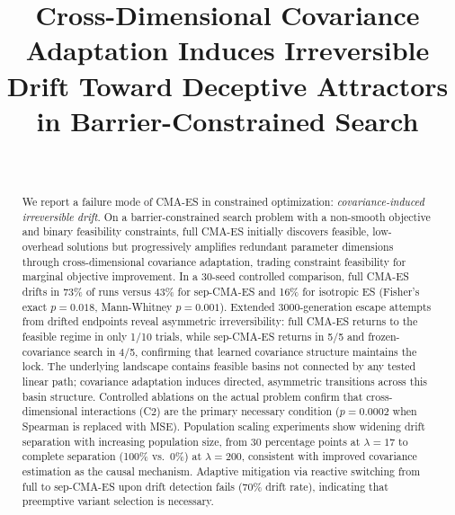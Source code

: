 \documentclass[twoside]{article}
\begin{document}

\title{\bf Cross-Dimensional Covariance Adaptation Induces Irreversible Drift
Toward Deceptive Attractors in Barrier-Constrained Search}

\author{%
 \hfill {}\\
}

\maketitle

\begin{abstract}
We report a failure mode of CMA-ES in constrained optimization:
\emph{covariance-induced irreversible drift}. On a barrier-constrained
search problem with a non-smooth objective and binary feasibility
constraints, full CMA-ES initially discovers feasible, low-overhead
solutions but progressively amplifies redundant parameter dimensions
through cross-dimensional covariance adaptation, trading constraint
feasibility for marginal objective improvement. In a 30-seed controlled
comparison, full CMA-ES drifts in 73\% of runs versus 43\% for
sep-CMA-ES and 16\% for isotropic ES (Fisher's exact $p = 0.018$,
Mann-Whitney $p = 0.001$). Extended 3000-generation escape attempts
from drifted endpoints reveal asymmetric irreversibility: full CMA-ES
returns to the feasible regime in only 1/10 trials, while sep-CMA-ES
returns in 5/5 and frozen-covariance search in 4/5, confirming that
learned covariance structure maintains the lock. The underlying
landscape contains feasible basins not connected by any tested linear
path; covariance adaptation induces directed, asymmetric transitions
across this basin structure. Controlled ablations
on the actual problem confirm that cross-dimensional interactions (C2)
are the primary necessary condition ($p = 0.0002$ when Spearman is
replaced with MSE). Population scaling experiments show widening drift
separation with increasing population size, from 30 percentage points
at $\lambda = 17$ to complete separation (100\% vs.\ 0\%) at
$\lambda = 200$, consistent with improved covariance estimation
as the causal mechanism. Adaptive mitigation via reactive
switching from full to sep-CMA-ES upon drift detection fails (70\%
drift rate), indicating that preemptive variant selection is necessary.
\end{abstract}
\end{document}
